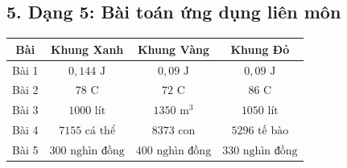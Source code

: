 \documentclass[12pt]{article}
\begin{document}
\subsection*{5. Dạng 5: Bài toán ứng dụng liên môn}
\begin{center}
	\begin{tabular}{|c|c|c|c|}
		\hline
		\textbf{Bài} & \textbf{Khung Xanh} & \textbf{Khung Vàng} & \textbf{Khung Đỏ} \\
		\hline
		Bài 1 & $0{,}144\text{ J}$ & $0{,}09\text{ J}$ & $0{,}09\text{ J}$ \\
		\hline
		Bài 2 & $78\text{ C}$ & $72\text{ C}$ & $86\text{ C}$ \\
		\hline
		Bài 3 & $1000\text{ lít}$ & $1350\text{ m}^3$ & $1050\text{ lít}$ \\
		\hline
		Bài 4 & $7155\text{ cá thể}$ & $8373\text{ con}$ & $5296\text{ tế bào}$ \\
		\hline
		Bài 5 & $300\text{ nghìn đồng}$ & $400\text{ nghìn đồng}$ & $330\text{ nghìn đồng}$ \\
		\hline
	\end{tabular}
\end{center}
\end{document}
